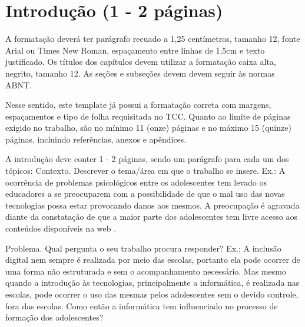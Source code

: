 \section{\esp Introdução (1 - 2 páginas)} 

A formatação deverá ter parágrafo recuado a 1,25 centímetros, tamanho 12, fonte Arial ou Times New Roman, espaçamento entre linhas de 1,5cm e texto justificado. Os títulos dos capítulos devem utilizar a formatação caixa alta, negrito, tamanho 12. As seções e subseções devem devem seguir às normas ABNT.

Nesse sentido, este template já possui a formatação correta com margens, espaçamentos e tipo de folha requisitada no TCC. Quanto ao limite de páginas exigido no trabalho, são no mínimo 11 (onze) páginas e no máximo 15 (quinze) páginas, incluindo referências, anexos e apêndices.


A introdução deve conter 1 - 2 páginas, sendo um parágrafo para cada um dos tópicos:
	Contexto. Descrever o tema/área em que o trabalho se insere. 
	Ex.: A ocorrência de problemas psicológicos entre os adolescentes tem levado os educadores a se preocuparem com a possibilidade de que o mal uso das novas tecnologias possa estar provocando danos aos mesmos. A preocupação é agravada diante da constatação de que a maior parte dos adolescentes tem livre acesso aos conteúdos disponíveis na web \cite{citelli2004,martins2012}.
	
 Problema. Qual pergunta o seu trabalho procura responder? 
	Ex.: A inclusão digital nem sempre é realizada por meio das escolas, portanto ela pode ocorrer de uma forma não estruturada e sem o acompanhamento necessário. Mas mesmo quando a introdução às tecnologias, principalmente a informática, é realizada nas escolas, pode ocorrer o uso das mesmas pelos adolescentes sem o devido controle, fora das escolas. Como então a informática tem influenciado no processo de formação dos adolescentes?
	
